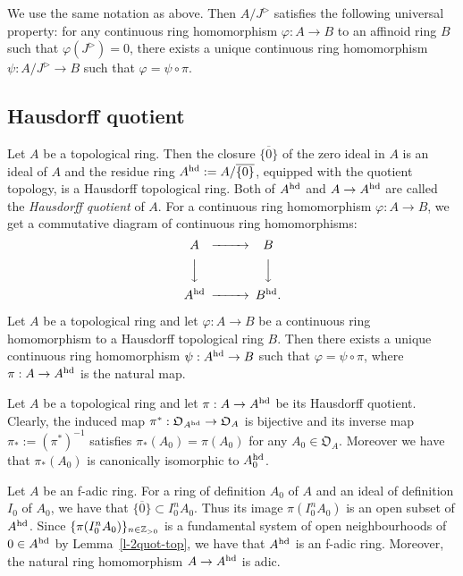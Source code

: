 \begin{rem}
We use the same notation as above. 
Then $A/J^{\rhd}$ satisfies the following universal property: 
for any continuous ring homomorphism $\varphi:A \to B$ 
to an affinoid ring $B$ such that $\varphi(J^{\rhd})=0$, 
there exists a unique continuous ring homomorphism 
$\psi:A/J^{\rhd} \to B$ such that $\varphi=\psi \circ \pi$. 
\end{rem}


\subsection{Hausdorff quotient}

Let $A$ be a topological ring. 
Then the closure $\overline{\{0\}}$ of the zero ideal in $A$ 
is an ideal of $A$ and 
the residue ring $A^{{\operatorname{hd}}}:=A/\overline{\{0\}}$, 
equipped with the quotient topology, is a Hausdorff topological ring. 
Both of $A^{{\operatorname{hd}}}$ and $A \to A^{{\operatorname{hd}}}$ are 
called the {\em Hausdorff quotient} of $A$. 
For a continuous ring homomorphism $\varphi:A \to B$, 
we get a commutative diagram of continuous ring homomorphisms: 
$$\begin{CD}
A @>>> B\\
@VVV @VVV\\
A^{\hd} @>>> B^{\hd}.
\end{CD}$$

\begin{rem}\label{r-hd-univ}
Let $A$ be a topological ring and let $\varphi:A \to B$ 
be a continuous ring homomorphism to a Hausdorff topological ring $B$. 
Then there exists a unique continuous ring homomorphism 
$\psi:A^{{\operatorname{hd}}} \to B$ such that $\varphi=\psi \circ \pi$, 
where $\pi:A \to A^{{\operatorname{hd}}}$ is the natural map. 
\end{rem}



\begin{rem}\label{r-quot-open}
Let $A$ be a topological ring and 
let $\pi:A \to A^{{\operatorname{hd}}}$ be its Hausdorff quotient. 
Clearly, the induced map $\pi^*:\mathfrak O_{A^{{\operatorname{hd}}}} \to \mathfrak O_{A}$ is bijective and its inverse map $\pi_*:=(\pi^*)^{-1}$ 
satisfies $\pi_*(A_0)=\pi(A_0)$ for any $A_0 \in \mathfrak O_{A}$. 
Moreover we have that $\pi_*(A_0)$ is 
canonically isomorphic to $A_0^{{\operatorname{hd}}}$. 
\end{rem}


Let $A$ be an f-adic ring. 
For a ring of definition $A_0$ of $A$ and 
an ideal of definition $I_0$ of $A_0$, 
we have that $\overline{\{0\}} \subset I_0^nA_0$. 
Thus its image $\pi(I_0^nA_0)$ is an open subset of $A^{{\operatorname{hd}}}$. 
Since $\{\pi(I_0^nA_0)\}_{n \in \mathbb{Z}_{>0}}$ is a fundamental system 
of open neighbourhoods of $0 \in A^{{\operatorname{hd}}}$ by Lemma~\ref{l-2quot-top}, 
we have that $A^{{\operatorname{hd}}}$ is an f-adic ring. 
Moreover, the natural ring homomorphism $A \to A^{{\operatorname{hd}}}$ is adic. 


